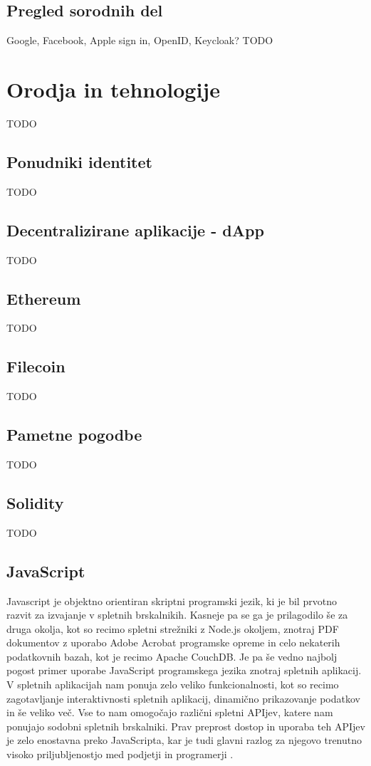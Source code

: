 \documentclass[a4paper,12pt,openright]{book}
\begin{document}
\section{Pregled sorodnih del}
Google, Facebook, Apple sign in, OpenID, Keycloak?
TODO


\chapter{Orodja in tehnologije}
TODO

\section{Ponudniki identitet}
TODO

\section{Decentralizirane aplikacije - dApp}
TODO

\section{Ethereum}
TODO

\section{Filecoin}
TODO

\section{Pametne pogodbe}
TODO

\section{Solidity}
TODO

\section{JavaScript}
Javascript je objektno orientiran skriptni programski jezik, ki je bil prvotno razvit za izvajanje v spletnih brskalnikih.
Kasneje pa se ga je prilagodilo še za druga okolja, kot so recimo spletni strežniki z Node.js okoljem, znotraj PDF
dokumentov z uporabo Adobe Acrobat programske opreme in celo nekaterih podatkovnih bazah, kot je recimo Apache CouchDB.
Je pa še vedno najbolj pogost primer uporabe JavaScript programskega jezika znotraj spletnih aplikacij.
V spletnih aplikacijah nam ponuja zelo veliko funkcionalnosti, kot so recimo zagotavljanje interaktivnosti spletnih
aplikacij, dinamično prikazovanje podatkov in še veliko več.
Vse to nam omogočajo različni spletni APIjev, katere nam ponujajo sodobni spletnih brskalniki.
Prav preprost dostop in uporaba teh APIjev je zelo enostavna preko JavaScripta, kar je tudi glavni razlog za njegovo
trenutno visoko priljubljenostjo med podjetji in programerji \cite{javascript_mozilla}.
\end{document}
